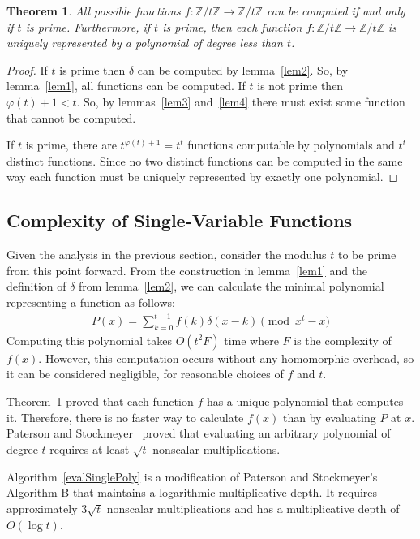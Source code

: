 \documentclass{article}
\def\zt{\mathbb{Z}/t\mathbb{Z}}
\newtheorem{thm}{Theorem}
\begin{document}
    \begin{thm}
      \label{thm1}
        All possible functions 
        $f:\zt\to\zt$ 
        can be computed if and only if $t$ is prime.
        Furthermore,
        if $t$ is prime, then each function 
        $f:\zt\to\zt$ 
        is uniquely represented by a polynomial of degree less than $t$. 
    \end{thm}
    \begin{proof}
      If $t$ is prime then $\delta$ can be computed by lemma~\ref{lem2}. So, by lemma~\ref{lem1}, all functions can be computed.
        If $t$ is not prime then $\varphi(t) + 1 < t$. So, by lemmas~\ref{lem3} and~\ref{lem4}
        there must exist some function that cannot be computed.

        If $t$ is prime, there are $t^{\varphi(t) +1} = t^t$ functions computable by polynomials and $t^t$ distinct functions.
        Since no two distinct functions can be computed in the same way each function must be uniquely represented by exactly one polynomial.
    \end{proof}

    \subsection{Complexity of Single-Variable Functions}
    \label{bounds}

    Given the analysis in the previous section,
    consider the modulus $t$ to be prime from this point forward.
    From the construction in lemma~\ref{lem1} and the definition of $\delta$ from lemma~\ref{lem2},
    we can calculate the minimal polynomial representing a function as follows:
    \begin{align}
        P(x) = \sum_{k = 0}^{t-1} f(k)\delta(x - k)\pmod{x^t - x}
    \end{align}
    Computing this polynomial takes $O(t^2F)$ time where $F$ is the complexity of $f(x)$.
    However, this computation occurs without any homomorphic overhead, so it can be considered negligible, for reasonable choices of $f$ and $t$.

    Theorem~\ref{thm1} proved that each function $f$ has a unique polynomial that computes it.
    Therefore, there is no faster way to calculate $f(x)$ than by evaluating $P$ at $x$.
    Paterson and Stockmeyer~\cite{paterson} proved that evaluating an arbitrary polynomial of degree
    $t$ requires at least $\sqrt{t}$ nonscalar multiplications.

    Algorithm~\ref{evalSinglePoly} is a modification of Paterson and Stockmeyer's Algorithm B that maintains a logarithmic multiplicative depth.
    It requires approximately $3\sqrt{t}$ nonscalar multiplications and has a multiplicative depth of $O(\log t)$.
\end{document}
